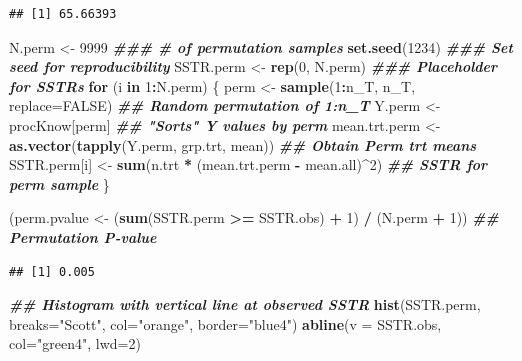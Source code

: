 \documentclass[
]{book}
\newenvironment{Shaded}{\begin{snugshade}}{\end{snugshade}}
\newcommand{\AttributeTok}[1]{\textcolor[rgb]{0.13,0.29,0.53}{#1}}
\newcommand{\ConstantTok}[1]{\textcolor[rgb]{0.56,0.35,0.01}{#1}}
\newcommand{\ControlFlowTok}[1]{\textcolor[rgb]{0.13,0.29,0.53}{\textbf{#1}}}
\newcommand{\DecValTok}[1]{\textcolor[rgb]{0.00,0.00,0.81}{#1}}
\newcommand{\DocumentationTok}[1]{\textcolor[rgb]{0.56,0.35,0.01}{\textbf{\textit{#1}}}}
\newcommand{\FunctionTok}[1]{\textcolor[rgb]{0.13,0.29,0.53}{\textbf{#1}}}
\newcommand{\NormalTok}[1]{#1}
\newcommand{\OtherTok}[1]{\textcolor[rgb]{0.56,0.35,0.01}{#1}}
\newcommand{\SpecialCharTok}[1]{\textcolor[rgb]{0.81,0.36,0.00}{\textbf{#1}}}
\newcommand{\StringTok}[1]{\textcolor[rgb]{0.31,0.60,0.02}{#1}}
\begin{document}
\begin{verbatim}
## [1] 65.66393
\end{verbatim}

\begin{Shaded}
\begin{Highlighting}[]
\NormalTok{N.perm }\OtherTok{\textless{}{-}} \DecValTok{9999}                                         \DocumentationTok{\#\#\# \# of permutation samples}
\FunctionTok{set.seed}\NormalTok{(}\DecValTok{1234}\NormalTok{)                                         }\DocumentationTok{\#\#\# Set seed for reproducibility}
\NormalTok{SSTR.perm }\OtherTok{\textless{}{-}} \FunctionTok{rep}\NormalTok{(}\DecValTok{0}\NormalTok{, N.perm)                            }\DocumentationTok{\#\#\# Placeholder for SSTR\textquotesingle{}s}
\ControlFlowTok{for}\NormalTok{ (i }\ControlFlowTok{in} \DecValTok{1}\SpecialCharTok{:}\NormalTok{N.perm) \{}
\NormalTok{  perm }\OtherTok{\textless{}{-}} \FunctionTok{sample}\NormalTok{(}\DecValTok{1}\SpecialCharTok{:}\NormalTok{n\_T, n\_T, }\AttributeTok{replace=}\ConstantTok{FALSE}\NormalTok{)            }\DocumentationTok{\#\# Random permutation of 1:n\_T}
\NormalTok{  Y.perm }\OtherTok{\textless{}{-}}\NormalTok{ procKnow[perm]                             }\DocumentationTok{\#\# "Sorts" Y values by perm}
\NormalTok{  mean.trt.perm }\OtherTok{\textless{}{-}} \FunctionTok{as.vector}\NormalTok{(}\FunctionTok{tapply}\NormalTok{(Y.perm, grp.trt, mean))  }\DocumentationTok{\#\# Obtain Perm trt means }
\NormalTok{  SSTR.perm[i] }\OtherTok{\textless{}{-}} \FunctionTok{sum}\NormalTok{(n.trt }\SpecialCharTok{*}\NormalTok{ (mean.trt.perm }\SpecialCharTok{{-}}\NormalTok{ mean.all)}\SpecialCharTok{\^{}}\DecValTok{2}\NormalTok{)  }\DocumentationTok{\#\# SSTR for perm sample}
\NormalTok{\}}

\NormalTok{(perm.pvalue }\OtherTok{\textless{}{-}}\NormalTok{ (}\FunctionTok{sum}\NormalTok{(SSTR.perm }\SpecialCharTok{\textgreater{}=}\NormalTok{ SSTR.obs) }\SpecialCharTok{+} \DecValTok{1}\NormalTok{) }\SpecialCharTok{/}\NormalTok{ (N.perm }\SpecialCharTok{+} \DecValTok{1}\NormalTok{))  }\DocumentationTok{\#\# Permutation P{-}value}
\end{Highlighting}
\end{Shaded}

\begin{verbatim}
## [1] 0.005
\end{verbatim}

\begin{Shaded}
\begin{Highlighting}[]
\DocumentationTok{\#\# Histogram with vertical line at observed SSTR}
\FunctionTok{hist}\NormalTok{(SSTR.perm, }\AttributeTok{breaks=}\StringTok{"Scott"}\NormalTok{, }\AttributeTok{col=}\StringTok{"orange"}\NormalTok{, }\AttributeTok{border=}\StringTok{"blue4"}\NormalTok{)}
\FunctionTok{abline}\NormalTok{(}\AttributeTok{v =}\NormalTok{ SSTR.obs, }\AttributeTok{col=}\StringTok{"green4"}\NormalTok{, }\AttributeTok{lwd=}\DecValTok{2}\NormalTok{)}
\end{Highlighting}
\end{Shaded}
\end{document}
